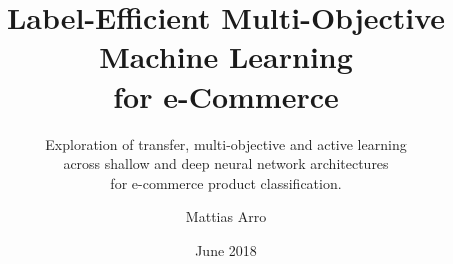 \documentclass[a4paper,11pt]{kth-mag}
\title{
      Label-Efficient Multi-Objective Machine Learning
      \\for e-Commerce
    }
\subtitle{
      Exploration of transfer, multi-objective and active learning
      \\ across shallow and deep neural network architectures
      \\ for e-commerce product classification.
    }
\author{Mattias Arro}
\date{June 2018}
\begin{document}
\frontmatter


\removepagenumbers
\maketitle
{}

\begin{abstract}

\end{abstract}
\clearpage

% 

% 

\tableofcontents*

\mainmatter

\listoffigures

\newpage



\pagestyle{newchap}






\renewcommand\bibname{References}





% 
\end{document}
